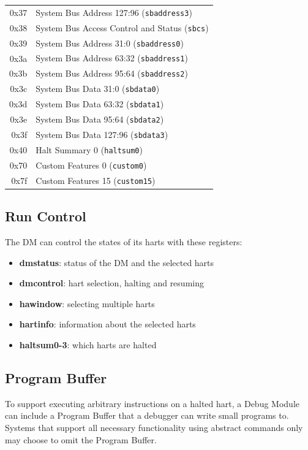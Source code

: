 \documentclass{article}
\begin{document}
\begin{table}[H]
\begin{center}
\begin{tabular}{|r|l|}
0x37 & System Bus Address 127:96 ({\tt sbaddress3}) \\
0x38 & System Bus Access Control and Status ({\tt sbcs}) \\
0x39 & System Bus Address 31:0 ({\tt sbaddress0}) \\
0x3a & System Bus Address 63:32 ({\tt sbaddress1}) \\
0x3b & System Bus Address 95:64 ({\tt sbaddress2}) \\
0x3c & System Bus Data 31:0 ({\tt sbdata0}) \\
0x3d & System Bus Data 63:32 ({\tt sbdata1}) \\
0x3e & System Bus Data 95:64 ({\tt sbdata2}) \\
0x3f & System Bus Data 127:96 ({\tt sbdata3}) \\
0x40 & Halt Summary 0 ({\tt haltsum0}) \\
0x70 & Custom Features 0 ({\tt custom0}) \\
0x7f & Custom Features 15 ({\tt custom15}) \\
         \hline
      \end{tabular}
   \end{center}
\end{table}
	
	\subsection{Run Control}
	
	The DM can control the states of its harts with these registers:
	
	\begin{itemize}
	\item \textbf{dmstatus}: status of the DM and the selected harts
	\item \textbf{dmcontrol}: hart selection, halting and resuming
	\item \textbf{hawindow}: selecting multiple harts
	\item \textbf{hartinfo}: information about the selected harts
	\item \textbf{haltsum0-3}: which harts are halted
	\end{itemize}
	
	\subsection{Program Buffer}
	
	To support executing arbitrary instructions on a halted hart, a Debug Module can include a Program Buffer that a debugger can write small programs to. Systems that support all necessary functionality using abstract commands only may choose to omit the Program Buffer.
\end{document}
